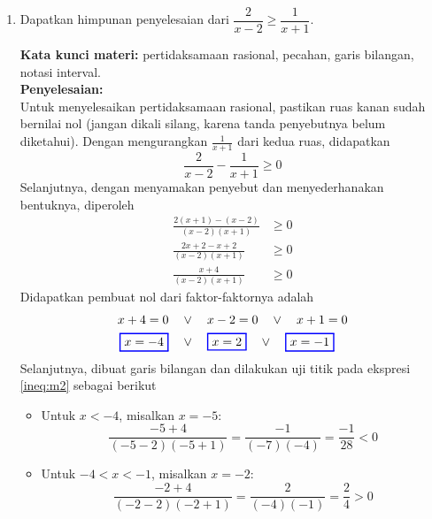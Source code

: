 \documentclass[10pt,openany,a4paper]{article}
\theoremstyle{definition}
\theoremstyle{definition}
\theoremstyle{plain}
\newenvironment{jawab}[2][tes]{%
\par\noindent\textbf{Kata kunci materi:} #1.\\
\textbf{Penyelesaian:} #2%
}{}
\begin{document}
\newpage

\begin{enumerate}
    \item Dapatkan himpunan penyelesaian dari $\dfrac{2}{x-2}\geq\dfrac{1}{x+1}$.
    \begin{jawab}[pertidaksamaan rasional, pecahan, garis bilangan, notasi interval]{~\\
        Untuk menyelesaikan pertidaksamaan rasional, pastikan ruas kanan sudah bernilai nol (jangan dikali silang, karena tanda penyebutnya belum diketahui). Dengan mengurangkan \(\frac{1}{x+1}\) dari kedua ruas, didapatkan
        \[
        \frac{2}{x-2} - \frac{1}{x+1} \geq 0
        \]
        Selanjutnya, dengan menyamakan penyebut dan menyederhanakan bentuknya, diperoleh
        \begin{align}
            \frac{2(x+1)-(x-2)}{(x-2)(x+1)} &\geq 0\nonumber\\
            \frac{2x+2-x+2}{(x-2)(x+1)} &\geq 0\nonumber \\
            \frac{x+4}{(x-2)(x+1)} &\geq 0 \label{ineq:m2}
        \end{align}
        Didapatkan pembuat nol dari faktor-faktornya adalah
        \begin{align*}
            x+4 = 0 \quad &\vee\quad  x-2 = 0 \quad\vee\quad x+1=0\\
            \colorlet{oldcolor}{.}
        \color{blue}
        \setlength{\fboxrule}{1pt} \boxed{\color{oldcolor}x=-4}\color{oldcolor} \quad &\vee\quad \colorlet{oldcolor}{.}
        \color{blue}
        \setlength{\fboxrule}{1pt} \boxed{\color{oldcolor}x=2}\color{oldcolor} \quad\vee\quad \colorlet{oldcolor}{.}
        \color{blue}
        \setlength{\fboxrule}{1pt} \boxed{\color{oldcolor}x=-1}\color{oldcolor}
        \end{align*}
        Selanjutnya, dibuat garis bilangan dan dilakukan uji titik pada ekspresi \eqref{ineq:m2} sebagai berikut
        \begin{itemize}
            \item Untuk \(x < -4\), misalkan \(x = -5\):
            \[
            \frac{-5+4}{(-5-2)(-5+1)} = \frac{-1}{(-7)(-4)} = \frac{-1}{28} < 0
            \]
            \item Untuk \(-4 < x < -1\), misalkan \(x = -2\):
            \[
            \frac{-2+4}{(-2-2)(-2+1)} = \frac{2}{(-4)(-1)} = \frac{2}{4} > 0
\]
\end{itemize}}
\end{jawab}
\end{enumerate}
\end{document}

